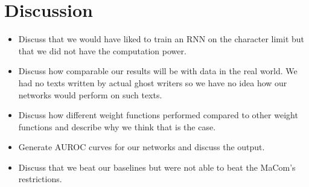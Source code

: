 \section{Discussion} \label{sec:discussion}


\begin{itemize}

    \item

        Discuss that we would have liked to train an RNN on the character limit
        but that we did not have the computation power.

    \item

        Discuss how comparable our results will be with data in the real world.
        We had no texts written by actual ghost writers so we have no idea how
        our networks would perform on such texts.

    \item

        Discuss how different weight functions performed compared to other
        weight functions and describe why we think that is the case.

    \item

        Generate AUROC curves for our networks and discuss the output.

    \item

        Discuss that we beat our baselines but were not able to beat the MaCom's
        restrictions.

\end{itemize}

